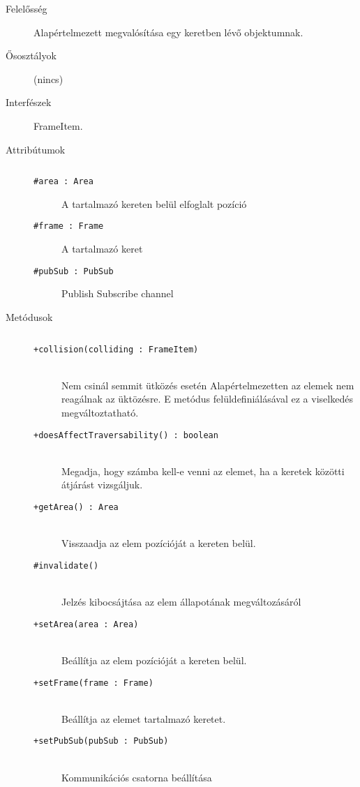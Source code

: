 			\begin{description}

				\item[Felelősség] Alapértelmezett megvalósítása egy keretben lévő objektumnak.

				\item[Ősosztályok] (nincs)
				\item[Interfészek] FrameItem.
				\item[Attribútumok]$\ $
					\begin{description}
						\item[\texttt{\#area : Area}]A tartalmazó kereten belül elfoglalt pozíció
						\item[\texttt{\#frame : Frame}]A tartalmazó keret
						\item[\texttt{\#pubSub : PubSub}]Publish Subscribe channel
					\end{description}
				\item[Metódusok]$\ $
					\begin{description}
						\item[\texttt{+collision(colliding : FrameItem)}] \hfill \\Nem csinál semmit ütközés esetén    Alapértelmezetten az elemek nem reagálnak az üktözésre.  E metódus felüldefiniálásával ez a viselkedés megváltoztatható. 
						\item[\texttt{+doesAffectTraversability() : boolean}] \hfill \\Megadja, hogy számba kell-e venni az elemet,  ha a keretek közötti átjárást vizsgáljuk. 
						\item[\texttt{+getArea() : Area}] \hfill \\Visszaadja az elem pozícióját a kereten belül. 
						\item[\texttt{\#invalidate()}] \hfill \\Jelzés kibocsájtása az elem állapotának megváltozásáról 
						\item[\texttt{+setArea(area : Area)}] \hfill \\Beállítja az elem pozícióját a kereten belül. 
						\item[\texttt{+setFrame(frame : Frame)}] \hfill \\Beállítja az elemet tartalmazó keretet. 
						\item[\texttt{+setPubSub(pubSub : PubSub)}] \hfill \\Kommunikációs csatorna beállítása 
					\end{description}
			\end{description}

